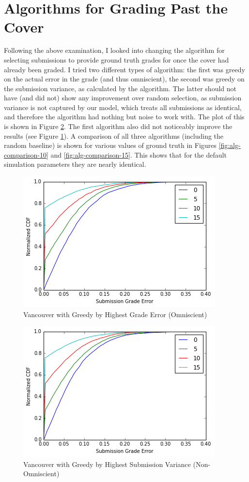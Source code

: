 \documentclass{article}
\begin{document}
	\section{Algorithms for Grading Past the Cover}
	Following the above examination, I looked into changing the algorithm for selecting submissions to provide ground truth grades for once the cover had already been graded. I tried two different types of algorithm: the first was greedy on the actual error in the grade (and thus omniscient), the second was greedy on the submission variance, as calculated by the algorithm. The latter should not have (and did not) show any improvement over random selection, as submission variance is not captured by our model, which treats all submissions as identical, and therefore the algorithm had nothing but noise to work with. The plot of this is shown in Figure \ref{fig:vancouver-highest-sumbission-variance}. The first algorithm also did not noticeably improve the results (see Figure \ref{fig:vancouver-highest-grade-error}). A comparison of all three algorithms (including the random baseline) is shown for various values of ground truth in Figures \ref{fig:alg-comparison-10} and \ref{fig:alg-comparison-15}. This shows that for the default simulation parameters they are nearly identical.
	
	\begin{figure}[h]
		\includegraphics{vancouver-highest-grade-error}
		\caption{Vancouver with Greedy by Highest Grade Error (Omniscient)}
		\label{fig:vancouver-highest-grade-error}
	\end{figure}
	
	\begin{figure}[h]
		\includegraphics{vancouver-highest-submission-variance}
		\caption{Vancouver with Greedy by Highest Submission Variance (Non-Omniscient)}
		\label{fig:vancouver-highest-sumbission-variance}
	\end{figure}
	
\end{document}
